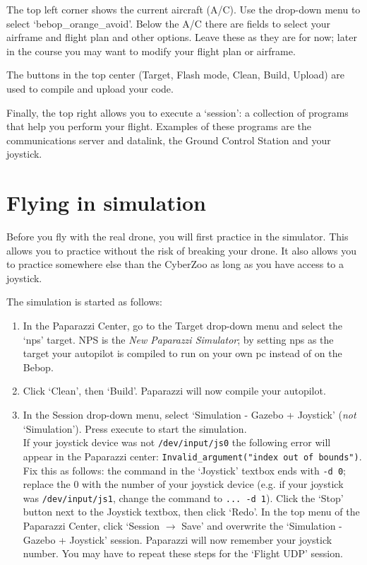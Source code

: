 \documentclass{article}
\begin{document}
The top left corner shows the current aircraft (A/C). Use the drop-down menu to select `bebop\_orange\_avoid'.
Below the A/C there are fields to select your airframe and flight plan and other options. Leave these as they are for now; later in the course you may want to modify your flight plan or airframe.

The buttons in the top center (Target, Flash mode, Clean, Build, Upload) are used to compile and upload your code.

Finally, the top right allows you to execute a `session': a collection of programs that help you perform your flight. Examples of these programs are the communications server and datalink, the Ground Control Station and your joystick.



\section{Flying in simulation}
Before you fly with the real drone, you will first practice in the simulator.
This allows you to practice without the risk of breaking your drone. It also allows you to practice somewhere else than the CyberZoo as long as you have access to a joystick.

\medskip
The simulation is started as follows:
\begin{enumerate}
\item In the Paparazzi Center, go to the Target drop-down menu and select the `nps' target. NPS is the \emph{New Paparazzi Simulator}; by setting nps as the target your autopilot is compiled to run on your own pc instead of on the Bebop.
\item Click `Clean', then `Build'. Paparazzi will now compile your autopilot.
\item In the Session drop-down menu, select `Simulation - Gazebo + Joystick' (\emph{not} `Simulation'). Press execute to start the simulation.\smallskip\\
If your joystick device was not \verb"/dev/input/js0" the following error will appear in the Paparazzi center: \verb|Invalid_argument("index out of bounds")|. Fix this as follows: the command in the `Joystick' textbox ends with \verb"-d 0"; replace the 0 with the number of your joystick device (e.g. if your joystick was \verb"/dev/input/js1", change the command to \verb"... -d 1"). Click the `Stop' button next to the Joystick textbox, then click `Redo'. In the top menu of the Paparazzi Center, click `Session $\rightarrow$ Save' and overwrite the `Simulation - Gazebo + Joystick' session. Paparazzi will now remember your joystick number. You may have to repeat these steps for the `Flight UDP' session.
\end{enumerate}
\end{document}
